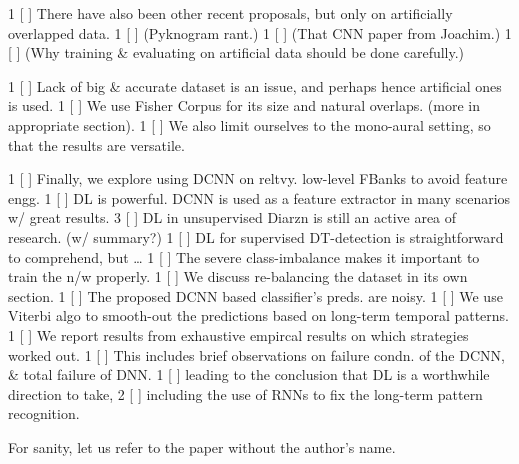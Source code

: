 \documentclass[a4paper]{article}
\begin{document}
{       1 [ ] There have also been other recent proposals, but only on artificially overlapped data.
       1 [ ] (Pyknogram rant.)
       1 [ ] (That CNN paper from Joachim.)
       1 [ ] (Why training & evaluating on artificial data should be done carefully.)

       1 [ ] Lack of big & accurate dataset is an issue, and perhaps hence artificial ones is used.
       1 [ ] We use Fisher Corpus for its size and natural overlaps. (more in appropriate section).
       1 [ ] We also limit ourselves to the mono-aural setting, so that the results are versatile.

       1 [ ] Finally, we explore using DCNN on reltvy. low-level FBanks to avoid feature engg.
       1 [ ] DL is powerful. DCNN is used as a feature extractor in many scenarios w/ great results.
       3 [ ] DL in unsupervised Diarzn is still an active area of research. (w/ summary?)
       1 [ ] DL for supervised DT-detection is straightforward to comprehend, but \ldots
       1 [ ] The severe class-imbalance makes it important to train the n/w properly.
       1 [ ] We discuss re-balancing the dataset in its own section.
       1 [ ] The proposed DCNN based classifier's preds. are noisy.
       1 [ ] We use Viterbi algo to smooth-out the predictions based on long-term temporal patterns.
       1 [ ] We report results from exhaustive empircal results on which strategies worked out.
       1 [ ] This includes brief observations on failure condn. of the DCNN, & total failure of DNN.
       1 [ ] leading to the conclusion that DL is a worthwhile direction to take,
       2 [ ] including the use of RNNs to fix the long-term pattern recognition.
}


For sanity, let us refer to the paper \cite{rabiner_tutorial_1989} without the author's name.



\end{document}

